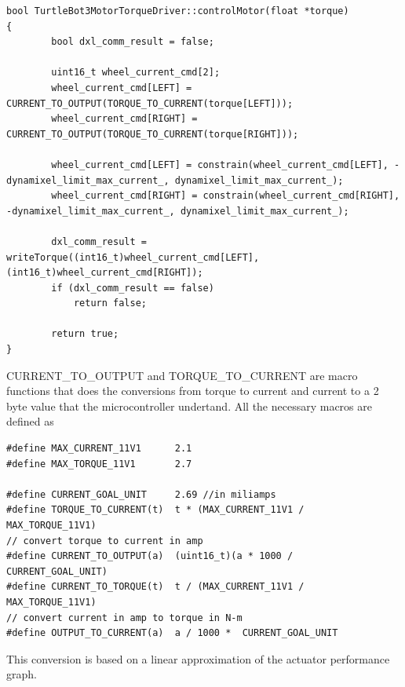 \documentclass[12]{article}
\begin{document}
\begin{lstlisting}[style=C++]
bool TurtleBot3MotorTorqueDriver::controlMotor(float *torque)
{
        bool dxl_comm_result = false;

        uint16_t wheel_current_cmd[2];
        wheel_current_cmd[LEFT] = CURRENT_TO_OUTPUT(TORQUE_TO_CURRENT(torque[LEFT]));
        wheel_current_cmd[RIGHT] = CURRENT_TO_OUTPUT(TORQUE_TO_CURRENT(torque[RIGHT]));

        wheel_current_cmd[LEFT] = constrain(wheel_current_cmd[LEFT], -dynamixel_limit_max_current_, dynamixel_limit_max_current_);
        wheel_current_cmd[RIGHT] = constrain(wheel_current_cmd[RIGHT], -dynamixel_limit_max_current_, dynamixel_limit_max_current_);

        dxl_comm_result = writeTorque((int16_t)wheel_current_cmd[LEFT], (int16_t)wheel_current_cmd[RIGHT]);
        if (dxl_comm_result == false)
            return false;

        return true;
}
\end{lstlisting}
CURRENT\_TO\_OUTPUT and TORQUE\_TO\_CURRENT are macro functions that does the conversions from torque to current and current to a 2 byte value that the microcontroller undertand. 
All the necessary macros are defined as
\begin{lstlisting}[style=C++]
#define MAX_CURRENT_11V1      2.1
#define MAX_TORQUE_11V1       2.7

#define CURRENT_GOAL_UNIT     2.69 //in miliamps
#define TORQUE_TO_CURRENT(t)  t * (MAX_CURRENT_11V1 /  MAX_TORQUE_11V1)
// convert torque to current in amp
#define CURRENT_TO_OUTPUT(a)  (uint16_t)(a * 1000 /  CURRENT_GOAL_UNIT)
#define CURRENT_TO_TORQUE(t)  t / (MAX_CURRENT_11V1 /  MAX_TORQUE_11V1)
// convert current in amp to torque in N-m
#define OUTPUT_TO_CURRENT(a)  a / 1000 *  CURRENT_GOAL_UNIT
\end{lstlisting}

This conversion is based on a linear approximation of the actuator performance graph.
\end{document}
